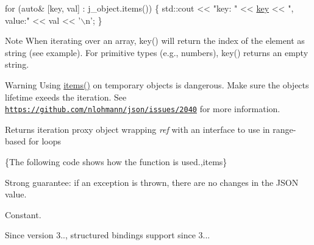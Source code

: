 \begin{DoxyCode}
\textcolor{keywordflow}{for} (\textcolor{keyword}{auto}& [key, val] : j\_object.items())
\{
    std::cout << \textcolor{stringliteral}{"key: "} << \hyperlink{namespacenlohmann_1_1detail_a2fb6dae6578e06ae73ca0d7cc8512b1aa3c6e0b8a9c15224a8228b9a98ca1531d}{key} << \textcolor{stringliteral}{", value:"} << val << \textcolor{charliteral}{'\(\backslash\)n'};
\}
\end{DoxyCode}


\begin{DoxyNote}{Note}
When iterating over an array, {\ttfamily key()} will return the index of the element as string (see example). For primitive types (e.\+g., numbers), {\ttfamily key()} returns an empty string.
\end{DoxyNote}
\begin{DoxyWarning}{Warning}
Using {\ttfamily \hyperlink{classnlohmann_1_1basic__json_a916a6ba75ec7624e9c6c977a52d6fd17}{items()}} on temporary objects is dangerous. Make sure the object\textquotesingle{}s lifetime exeeds the iteration. See \href{https://github.com/nlohmann/json/issues/2040}{\tt https\+://github.\+com/nlohmann/json/issues/2040} for more information.
\end{DoxyWarning}
\begin{DoxyReturn}{Returns}
iteration proxy object wrapping {\itshape ref} with an interface to use in range-\/based for loops
\end{DoxyReturn}
\{The following code shows how the function is used.,items\}

Strong guarantee\+: if an exception is thrown, there are no changes in the J\+S\+ON value.

Constant.

\begin{DoxySince}{Since}
version 3.., structured bindings support since 3... 
\end{DoxySince}
